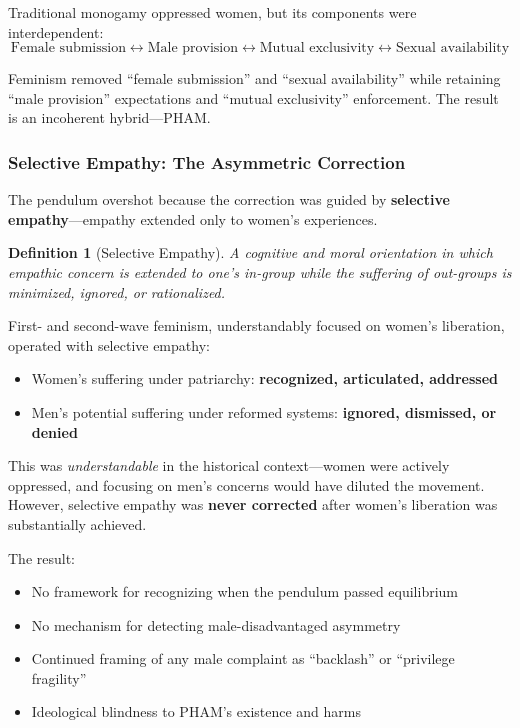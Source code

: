 \documentclass[12pt, letterpaper]{article}
\newtheorem{definition}{Definition}[section]
\begin{document}
Traditional monogamy oppressed women, but its components were interdependent:
\[
\text{Female submission} \leftrightarrow \text{Male provision} \leftrightarrow \text{Mutual exclusivity} \leftrightarrow \text{Sexual availability}
\]

Feminism removed ``female submission'' and ``sexual availability'' while retaining ``male provision'' expectations and ``mutual exclusivity'' enforcement. The result is an incoherent hybrid---PHAM.

\subsubsection{Selective Empathy: The Asymmetric Correction}

The pendulum overshot because the correction was guided by \textbf{selective empathy}---empathy extended only to women's experiences.

\begin{definition}[Selective Empathy]
A cognitive and moral orientation in which empathic concern is extended to one's in-group while the suffering of out-groups is minimized, ignored, or rationalized.
\end{definition}

First- and second-wave feminism, understandably focused on women's liberation, operated with selective empathy:
\begin{itemize}
    \item Women's suffering under patriarchy: \textbf{recognized, articulated, addressed}
    \item Men's potential suffering under reformed systems: \textbf{ignored, dismissed, or denied}
\end{itemize}

This was \textit{understandable} in the historical context---women were actively oppressed, and focusing on men's concerns would have diluted the movement. However, selective empathy was \textbf{never corrected} after women's liberation was substantially achieved.

The result:
\begin{itemize}
    \item No framework for recognizing when the pendulum passed equilibrium
    \item No mechanism for detecting male-disadvantaged asymmetry
    \item Continued framing of any male complaint as ``backlash'' or ``privilege fragility''
    \item Ideological blindness to PHAM's existence and harms
\end{itemize}
\end{document}
